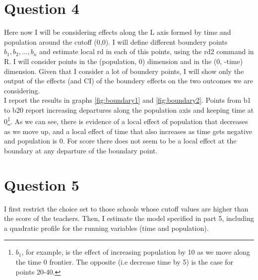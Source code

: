 \documentclass{article}
\begin{document}
\section*{Question 4}

Here now I will be considering effects along the L axis formed by time and population around the cutoff (0,0). I will define different boundery points $b_1, b_2,..., b_n$ and estimate local rd in each of this points, using the rd2 command in R. I will consider points in the (population, 0) dimension and in the (0, -time) dimension. Given that I consider a lot of boundery points, I will show only the output of the effects (and CI) of the boundery effects on the two outcomes we are considering. \\

I report the results in graphs \ref{fig:boundary1} and \ref{fig:boundary2}. Points from b1 to b20 report increasing departures along the population axis and keeping time at 0\footnote{$b_1$, for example, is the effect of increasing population by 10 as we move along the time 0 frontier. The opposite (i.e decrease time by 5) is the case for points 20-40.}. As we can see, there is evidence of a local effect of population that decreases as we move up, and a local effect of time that also increases as time gets negative and population is 0. For score there does not seem to be a local effect at the boundary at any departure of the boundary point.



\section*{Question 5}
I first restrict the choice set to those schools whose cutoff values are higher than the score of the teachers. Then, I estimate the model specified in part 5, including a quadratic profile for the running variables (time and population).
\end{document}
